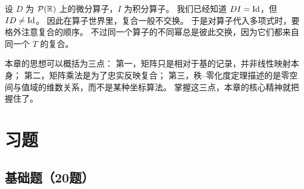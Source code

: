 \begin{example} 设 $D$ 为 $\mathcal{P}(\mathbb{R})$ 上的微分算子，$I$ 为积分算子。 我们已经知道 $DI=\mathrm{Id}$，但 $ID\neq\mathrm{Id}$。
因此在算子世界里，复合一般不交换。 于是对算子代入多项式时，要格外注意复合的顺序。 不过同一个算子的不同幂总是彼此交换，因为它们都来自同一个 $T$ 的复合。
\end{example}

\begin{remark} 本章的思想可以概括为三点： 第一，矩阵只是相对于基的记录，并非线性映射本身； 第二，矩阵乘法是为了忠实反映复合；
第三，秩--零化度定理描述的是零空间与值域的维数关系，而不是某种坐标算法。 掌握这三点，本章的核心精神就把握住了。 \end{remark}

\section*{习题}

\subsection*{基础题（20题）}

